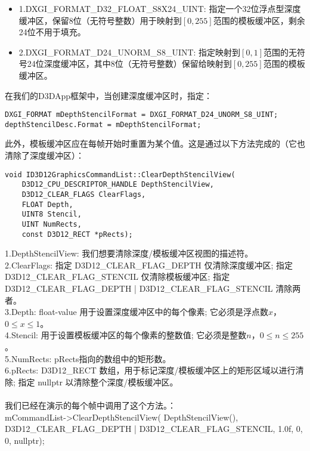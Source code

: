 \begin{itemize}
  \item 1.DXGI\_FORMAT\_D32\_FLOAT\_S8X24\_UINT: 指定一个32位浮点型深度缓冲区，保留8位（无符号整数）用于映射到$[0,255]$范围的模板缓冲区，剩余24位不用于填充。
  \item 2.DXGI\_FORMAT\_D24\_UNORM\_S8\_UINT: 指定映射到$[0,1]$范围的无符号24位深度缓冲区，其中8位（无符号整数）保留给映射到$[0,255]$范围的模板缓冲区。
\end{itemize}

\begin{flushleft}
在我们的D3DApp框架中，当创建深度缓冲区时，指定：\\
\end{flushleft}

\begin{lstlisting}
DXGI_FORMAT mDepthStencilFormat = DXGI_FORMAT_D24_UNORM_S8_UINT;
depthStencilDesc.Format = mDepthStencilFormat;
\end{lstlisting}

\begin{flushleft}
此外，模板缓冲区应在每帧开始时重置为某个值。这是通过以下方法完成的（它也清除了深度缓冲区）：\\
\end{flushleft}

\begin{lstlisting}
void ID3D12GraphicsCommandList::ClearDepthStencilView(
    D3D12_CPU_DESCRIPTOR_HANDLE DepthStencilView,
    D3D12_CLEAR_FLAGS ClearFlags,
    FLOAT Depth,
    UINT8 Stencil,
    UINT NumRects,
    const D3D12_RECT *pRects);
\end{lstlisting}

\begin{flushleft}
1.DepthStencilView: 我们想要清除深度/模板缓冲区视图的描述符。\\

2.ClearFlags: 指定 D3D12\_CLEAR\_FLAG\_DEPTH 仅清除深度缓冲区; 指定 D3D12\_CLEAR\_FLAG\_STENCIL 仅清除模板缓冲区; 指定 D3D12\_CLEAR\_FLAG\_DEPTH | D3D12\_CLEAR\_FLAG\_STENCIL 清除两者。\\

3.Depth: float-value 用于设置深度缓冲区中的每个像素; 它必须是浮点数$x$，$0\leq x\leq 1$。\\

4.Stencil: 用于设置模板缓冲区的每个像素的整数值; 它必须是整数$n$，$0\leq n\leq 255$。\\

5.NumRects: pRects指向的数组中的矩形数。\\

6.pRects: D3D12\_RECT 数组，用于标记深度/模板缓冲区上的矩形区域以进行清除; 指定 nullptr 以清除整个深度/模板缓冲区。\\
~\\
我们已经在演示的每个帧中调用了这个方法。：\\
mCommandList->ClearDepthStencilView(
    DepthStencilView(),
    D3D12\_CLEAR\_FLAG\_DEPTH | D3D12\_CLEAR\_FLAG\_STENCIL,
    1.0f, 0, 0, nullptr);
\end{flushleft}

